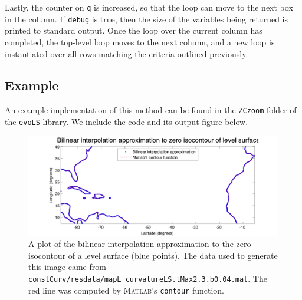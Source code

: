 \documentclass{article}
\begin{document}
\lstellipsisabove


Lastly, the counter on \texttt{q} is increased, so that the loop
can move to the next box in the column. If \texttt{debug} is true,
then the size of the variables being returned is printed to
standard output. Once the loop over the current column has
completed, the top-level loop moves to the next column, and a new
loop is instantiated over all rows matching the criteria outlined
previously.

\subsection{Example}
\label{sec:example}

An example implementation of this method can be found in the
\texttt{ZCzoom} folder of the \texttt{evoLS} library. We include
the code and its output figure below.

\begin{figure}[h]
  \centering
  \includegraphics[width=\textwidth]{figures/bilin-interp-approx.png}
  \caption{A plot of the bilinear interpolation approximation to the
zero isocontour of a level surface (blue points). The data used to generate this
image came from
\texttt{constCurv/resdata/mapL\_curvatureLS.tMax2.3.b0.04.mat}. The
red line was computed by \textsc{Matlab}'s \texttt{contour}
function. }
\label{fig:bilin-interp}
\end{figure}




\clearpage


\end{document}
